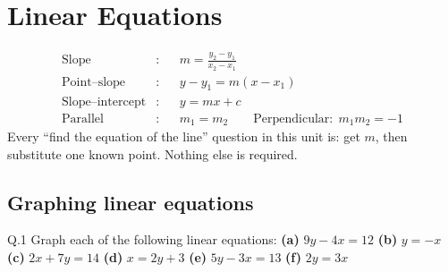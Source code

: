 \chapter{Linear Equations}


\begin{keyidea}
\begin{align*}
\text{Slope}&: && m=\frac{y_2-y_1}{x_2-x_1}\\
\text{Point--slope}&: && y-y_1=m(x-x_1)\\
\text{Slope--intercept}&: && y=mx+c\\
\text{Parallel}&: && m_1=m_2 \qquad
\text{Perpendicular}: \; m_1m_2=-1
\end{align*}
Every ``find the equation of the line'' question in this unit is: get $m$, then
substitute one known point. Nothing else is required.
\end{keyidea}

\section{Graphing linear equations}

\begin{question}{Q.1}
Graph each of the following linear equations:
\textbf{(a)} $9y-4x=12$ \quad \textbf{(b)} $y=-x$ \quad
\textbf{(c)} $2x+7y=14$ \quad \textbf{(d)} $x=2y+3$ \quad
\textbf{(e)} $5y-3x=13$ \quad \textbf{(f)} $2y=3x$
\end{question}

